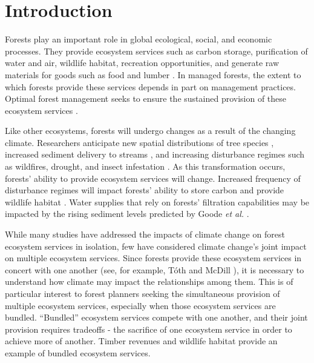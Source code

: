 
\section{Introduction}
\label{sec:intro}
 
Forests play an important role in global ecological, social, and economic processes. They provide ecosystem services such as carbon storage, purification of water and air, wildlife habitat, recreation opportunities, and generate raw materials for goods such as food and lumber \cite{daily1997ecosystem}. In managed forests, the extent to which forests provide these services depends in part on management practices. Optimal forest management seeks to ensure the sustained provision of these ecosystem services \cite{cfrForestMgmt}.

Like other ecosystems, forests will undergo changes as a result of the changing climate. Researchers anticipate new spatial distributions of tree species \cite{iverson1998predicting}, increased sediment delivery to streams \cite{Goode20121}, and increasing disturbance regimes such as wildfires, drought, and insect infestation \cite{vose2012effects}. As this transformation occurs, forests' ability to provide ecosystem services will change. Increased frequency of disturbance regimes will impact forests' ability to store carbon \cite{bonan2008forests} and provide wildlife habitat \cite{mckenzie2004climatic}. Water supplies that rely on forests' filtration capabilities may be impacted by the rising sediment levels predicted by Goode \textit{et al.} \cite{Goode20121}.

While many studies have addressed the impacts of climate change on forest ecosystem services in isolation\cite{vose2012effects}\cite{bonan2008forests}\cite{mckenzie2004climatic}, few have considered climate change's joint impact on multiple ecosystem services. Since forests provide these ecosystem services in concert with one another (see, for example, T{\'o}th and McDill \cite{toth2009finding}), it is necessary to understand how climate may impact the relationships among them. This is of particular interest to forest planners seeking the simultaneous provision of multiple ecosystem services, especially when those ecosystem services are bundled. ``Bundled'' ecosystem services compete with one another, and their joint provision requires tradeoffs - the sacrifice of one ecosystem service in order to achieve more of another. Timber revenues and wildlife habitat provide an example of bundled ecosystem services.%

